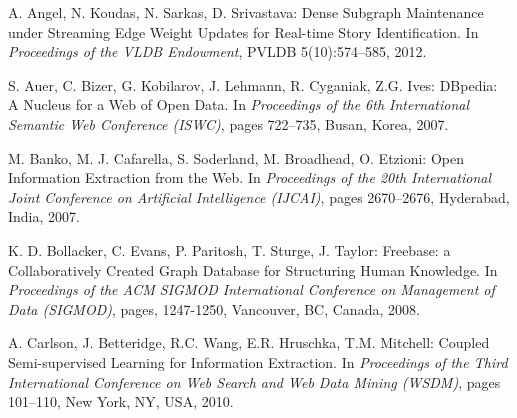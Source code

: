 \documentclass[11pt,a4paper]{article}
\begin{document}


\begin{thebibliography}{99}

 A. Angel, N. Koudas, N. Sarkas, D. Srivastava: Dense Subgraph Maintenance under Streaming Edge Weight Updates for Real-time Story Identification. In \textit{Proceedings of the VLDB Endowment}, PVLDB 5(10):574--585, 2012.

 S. Auer, C. Bizer, G. Kobilarov, J. Lehmann, R. Cyganiak, Z.G. Ives: DBpedia: A Nucleus for a Web of Open Data.  In \textit{Proceedings of the 6th International Semantic Web Conference (ISWC)}, pages 722--735, Busan, Korea, 2007.


 M. Banko, M. J. Cafarella, S. Soderland, M. Broadhead, O. Etzioni: Open Information Extraction from the Web. In \textit{Proceedings of the 20th International Joint Conference on Artificial Intelligence (IJCAI)}, pages 2670--2676, Hyderabad, India, 2007.

 K. D. Bollacker, C. Evans, P. Paritosh, T. Sturge, J. Taylor: Freebase: a Collaboratively Created Graph Database for Structuring Human Knowledge.  In \textit{Proceedings of the ACM SIGMOD International Conference on Management of Data (SIGMOD)}, pages, 1247-1250, Vancouver, BC, Canada, 2008.

%
%

 A. Carlson, J. Betteridge, R.C. Wang, E.R. Hruschka, T.M. Mitchell: Coupled Semi-supervised Learning for Information Extraction. In \textit{Proceedings of the Third International Conference on Web Search and Web Data Mining (WSDM)}, pages 101--110, New York, NY, USA, 2010.
		 

\end{thebibliography}
\end{document}

